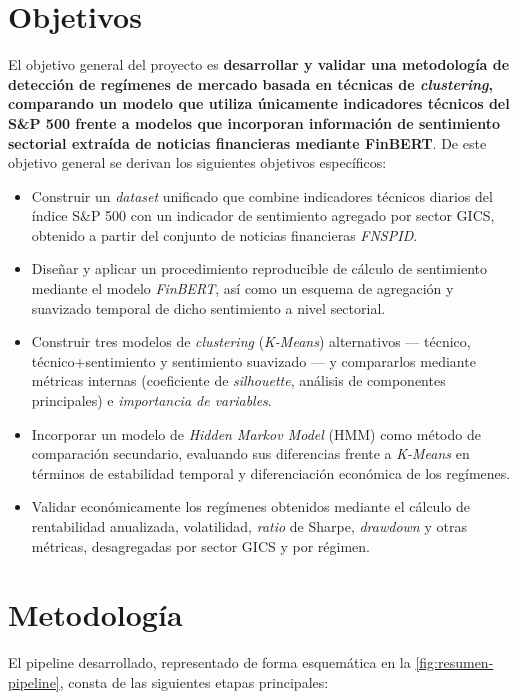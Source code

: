 \section*{Objetivos}

El objetivo general del proyecto es \textbf{desarrollar y validar una
metodología de detección de regímenes de mercado basada en técnicas de
\textit{clustering}, comparando un modelo que utiliza únicamente
indicadores técnicos del S\&P 500 frente a modelos que incorporan
información de sentimiento sectorial extraída de noticias financieras
mediante FinBERT}. De este objetivo general se derivan los siguientes
objetivos específicos:

\begin{itemize}
  \item Construir un \textit{dataset} unificado que combine indicadores
  técnicos diarios del índice S\&P 500 con un indicador de sentimiento
  agregado por sector GICS, obtenido a partir del conjunto de noticias
  financieras \textit{FNSPID}.
  \item Diseñar y aplicar un procedimiento reproducible de cálculo de
  sentimiento mediante el modelo \textit{FinBERT}, así como un esquema de
  agregación y suavizado temporal de dicho sentimiento a nivel sectorial.
  \item Construir tres modelos de \textit{clustering} (\textit{K-Means})
  alternativos --- técnico, técnico+sentimiento y sentimiento suavizado
  --- y compararlos mediante métricas internas (coeficiente de
  \textit{silhouette}, análisis de componentes principales) e
  \textit{importancia de variables}.
  \item Incorporar un modelo de \textit{Hidden Markov Model} (HMM) como
  método de comparación secundario, evaluando sus diferencias frente a
  \textit{K-Means} en términos de estabilidad temporal y diferenciación
  económica de los regímenes.
  \item Validar económicamente los regímenes obtenidos mediante el
  cálculo de rentabilidad anualizada, volatilidad, \textit{ratio} de
  Sharpe, \textit{drawdown} y otras métricas, desagregadas por sector
  GICS y por régimen.
\end{itemize}

\section*{Metodología}

El pipeline desarrollado, representado de forma esquemática en la
\autoref{fig:resumen-pipeline}, consta de las siguientes etapas
principales:

